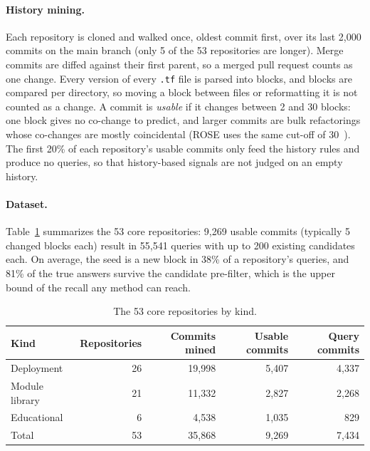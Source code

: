 \paragraph{History mining.} Each repository is cloned and walked once, oldest commit first, over
its last 2,000 commits on the main branch (only 5 of the 53 repositories are longer). Merge commits
are diffed against their first parent, so a merged pull request counts as one change. Every version
of every \texttt{.tf} file is parsed into blocks, and blocks are compared per directory, so moving a
block between files or reformatting it is not counted as a change. A commit is \emph{usable} if it
changes between 2 and 30 blocks: one block gives no co-change to predict, and larger commits are bulk
refactorings whose co-changes are mostly coincidental (ROSE uses the same cut-off of
30~\cite{zimmermann2004rose}). The first 20\% of each repository's usable commits only feed the
history rules and produce no queries, so that history-based signals are not judged on an empty
history.

\paragraph{Dataset.} Table~\ref{tab:dataset} summarizes the 53 core repositories: 9,269 usable
commits (typically 5 changed blocks each) result in 55,541 queries with up to 200 existing candidates
each. On average, the seed is a new block in 38\% of a repository's queries, and 81\% of the true
answers survive the candidate pre-filter, which is the upper bound of the recall any method can
reach.

\begin{table}[ht]
\centering
\small
\caption{The 53 core repositories by kind.}
\label{tab:dataset}
\begin{tabular}{@{}lrrrr@{}}
\toprule
Kind & Repositories & Commits mined & Usable commits & Query commits \\
\midrule
Deployment      & 26 & 19,998 & 5,407 & 4,337 \\
Module library  & 21 & 11,332 & 2,827 & 2,268 \\
Educational     &  6 &  4,538 & 1,035 &   829 \\
\midrule
Total           & 53 & 35,868 & 9,269 & 7,434 \\
\bottomrule
\end{tabular}
\end{table}
